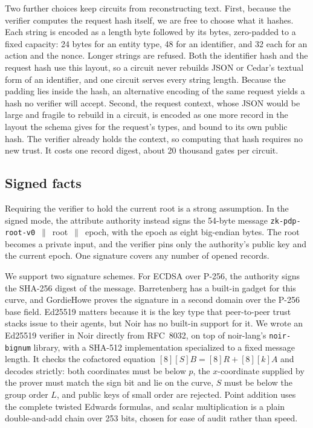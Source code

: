 \documentclass[11pt]{article}
\begin{document}
Two further choices keep circuits from reconstructing text. First, because the verifier computes the request hash itself, we are free to choose what it hashes. Each string is encoded as a length byte followed by its bytes, zero-padded to a fixed capacity: 24 bytes for an entity type, 48 for an identifier, and 32 each for an action and the nonce. Longer strings are refused. Both the identifier hash and the request hash use this layout, so a circuit never rebuilds JSON or Cedar's textual form of an identifier, and one circuit serves every string length. Because the padding lies inside the hash, an alternative encoding of the same request yields a hash no verifier will accept. Second, the request context, whose JSON would be large and fragile to rebuild in a circuit, is encoded as one more record in the layout the schema gives for the request's types, and bound to its own public hash. The verifier already holds the context, so computing that hash requires no new trust. It costs one record digest, about 20 thousand gates per circuit.

\subsection{Signed facts}
\label{sec:signed}

Requiring the verifier to hold the current root is a strong assumption. In the signed mode, the attribute authority instead signs the 54-byte message \texttt{zk-pdp-root-v0}~$\|$~root~$\|$~epoch, with the epoch as eight big-endian bytes. The root becomes a private input, and the verifier pins only the authority's public key and the current epoch. One signature covers any number of opened records.

We support two signature schemes. For ECDSA over P-256, the authority signs the SHA-256 digest of the message. Barretenberg has a built-in gadget for this curve, and GordieHowe proves the signature in a second domain over the P-256 base field. Ed25519 matters because it is the key type that peer-to-peer trust stacks issue to their agents, but Noir has no built-in support for it. We wrote an Ed25519 verifier in Noir directly from RFC~8032, on top of noir-lang's \texttt{noir-bignum} library, with a SHA-512 implementation specialized to a fixed message length. It checks the cofactored equation $[8][S]B = [8]R + [8][k]A$ and decodes strictly: both coordinates must be below $p$, the $x$-coordinate supplied by the prover must match the sign bit and lie on the curve, $S$ must be below the group order $L$, and public keys of small order are rejected. Point addition uses the complete twisted Edwards formulas, and scalar multiplication is a plain double-and-add chain over 253 bits, chosen for ease of audit rather than speed.
\end{document}
